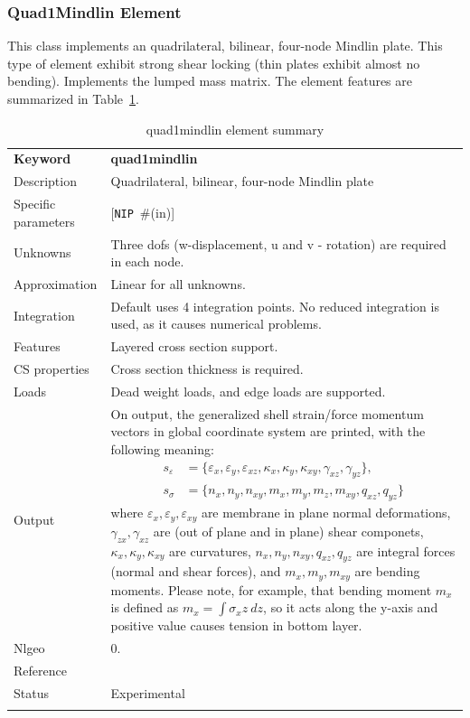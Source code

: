 \documentclass[a4paper]{article}
\newcommand{\param}[1]{\texttt{#1}} %
\newcommand{\optional}[1]{[#1]} %
\newcommand{\field}[2]{\param{#1}~\#{\tiny(#2)}} %
\newcommand{\optField}[2]{\optional{\field{#1}{#2}}}
\newcommand{\templabel}{}%
\newcommand{\tempcaption}{}%
\newcounter{nelpar}
\newenvironment{elementsummary}[5]{%
  \gdef\tempcaption{#4}%
  \gdef\templabel{#5}%
  \setcounter{nelpar}{0}%
  \begin{center} %
    \begin{table}[!htb] %
      \begin{tabular}{|l|p{9cm}|}\hline %
        {\bf Keyword} & \bf{#1}\\ %
        {Description} & {#2}\\ %
        {Specific parameters} & {#3}\\ \hline %
}{
  \\ \hline %
      \end{tabular}%
      \caption{\tempcaption}%
      \label{\templabel}%
    \end{table}%
  \end{center}%
}
\newcommand{\elementParam}[1]{%
  \ifthenelse{\value{nelpar}>0} %
             {&{#1}}%
             {\setcounter{nelpar}{1}Parameters&{#1}}%
             \\%
}
\newcommand{\elementDescription}[2]{{#1} & {#2}\\}
\begin{document}
\subsubsection{Quad1Mindlin Element} \label{quad1mindlin}
This class implements an quadrilateral, bilinear, four-node Mindlin plate.
This type of element exhibit strong shear locking (thin plates exhibit almost no bending).
Implements the lumped mass matrix. The element features are summarized in Table~\ref{quad1mindlinsummary}.

\begin{elementsummary}{quad1mindlin}{Quadrilateral, bilinear, four-node Mindlin plate}{\optField{NIP}{in}}{quad1mindlin element summary}{quad1mindlinsummary}
\elementDescription{Unknowns}{Three dofs (w-displacement, u and v - rotation) are required in each node.}
\elementDescription{Approximation}{Linear for all unknowns.}
\elementDescription{Integration}{Default uses 4 integration points. No reduced integration is used, as it causes numerical problems.}
\elementDescription{Features}{Layered cross section support.}
\elementDescription{CS properties}{Cross section thickness is required.}
\elementDescription{Loads}{Dead weight loads, and edge loads are supported.}
\elementDescription{Output}{On output, the generalized shell strain/force momentum vectors in global coordinate system are printed, with the following meaning:
\begin{align*}
s_{\varepsilon} &= \{\varepsilon_x, \varepsilon_y, \varepsilon_{xz}, \kappa_x, \kappa_y, \kappa_{xy}, \gamma_{xz}, \gamma_{yz}\},\\
s_{\sigma} &= \{n_x, n_y, n_{xy}, m_x, m_y, m_z, m_{xy}, q_{xz}, q_{yz}\}
\end{align*}
where $\varepsilon_x, \varepsilon_y, \varepsilon_{xy}$ are membrane in plane normal deformations, $\gamma_{zx}, \gamma_{xz}$ are (out of plane and in plane) shear componets, $\kappa_x, \kappa_y, \kappa_{xy}$ are curvatures, $n_x, n_y, n_{xy}, q_{xz}, q_{yz}$ are integral forces (normal and shear forces), and $m_x, m_y, m_{xy}$ are bending moments. 
Please note, for example, that bending moment $m_x$ is defined as $m_x=\int \sigma_x z\ dz$, so it acts along the y-axis and positive value causes tension in bottom layer.}
\elementDescription{Nlgeo}{0.}
\elementDescription{Reference}{\cite{RobertCook1989}}
\elementDescription{Status}{Experimental}
\end{elementsummary}
\end{document}
